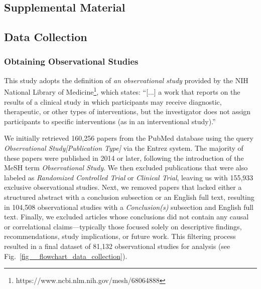 \begin{appendices}

\setcounter{section}{0}
\renewcommand{\thesection}{SI}
\renewcommand{\thesubsection}{\Alph{subsection}}

\renewcommand{\thetable}{S\arabic{table}}
\setcounter{table}{0}  %
\renewcommand{\thefigure}{S\arabic{figure}}
\setcounter{figure}{0}



\section{Supplemental Material}

\subsection{Data Collection}

\subsubsection{Obtaining Observational Studies}

This study adopts the definition of {\em an observational study} provided by
the NIH National Library of Medicine\footnote{https://www.ncbi.nlm.nih.gov/mesh/68064888},
which states:
``[...] a work that reports on the results of a clinical study
in which participants may receive diagnostic, therapeutic, or other types of interventions,
but the investigator does not assign participants to specific interventions (as in an interventional study).''

We initially retrieved 160,256 papers from the PubMed database using the query
{\em Observational Study[Publication Type]} via the Entrez system. The majority
of these papers were published in 2014 or later, following the
introduction of the MeSH term {\em Observational Study}. We then excluded
publications that were also labeled as {\em Randomized Controlled Trial} or {\em
Clinical Trial}, leaving us with 155,933 exclusive observational studies. Next,
we removed papers that lacked either a structured abstract with a conclusion
subsection or an English full text, resulting in 104,508 observational studies
with a {\em Conclusion(s)} subsection and English full text. Finally, we
excluded articles whose conclusions did not contain any causal or correlational
claims—typically those focused solely on descriptive findings, recommendations,
study implications, or future work. This filtering process resulted in a final
dataset of 81,132 observational studies for analysis (see
Fig.~\ref{fig__flowchart_data_collection}).



\end{appendices}
